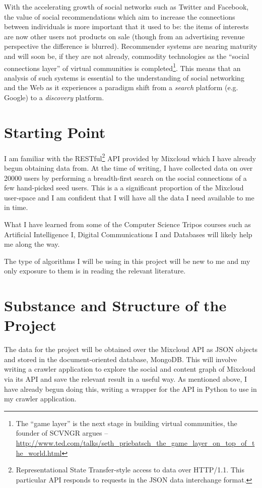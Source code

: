 With the accelerating growth of social networks such as Twitter and Facebook, the value of social recommendations which aim to increase the connections between individuals is more important that it used to be: the items of interests are now other users not products on sale (though from an advertising revenue perspective the difference is blurred). Recommender systems are nearing maturity and will soon be, if they are not already, commodity technologies as the ``social connections layer'' of virtual communities is completed\footnote{The ``game layer'' is the next stage in building virtual communities, the founder of SCVNGR argues -- \url{http://www.ted.com/talks/seth_priebatsch_the_game_layer_on_top_of_the_world.html}}. This means that an analysis of such systems is essential to the understanding of social networking and the Web as it experiences a paradigm shift from a \emph{search} platform (e.g. Google) to a \emph{discovery} platform.

\section{Starting Point}

I am familiar with the RESTful\footnote{Representational State Transfer-style access to data over HTTP/1.1. This particular API responds to requests in the JSON data interchange format.} API provided by Mixcloud which I have already begun obtaining data from. At the time of writing, I have collected data on over 20000 users by performing a breadth-first search on the social connections of a few hand-picked seed users. This is a a significant proportion of the Mixcloud user-space and I am confident that I will have all the data I need available to me in time.

What I have learned from some of the Computer Science Tripos courses such as Artificial Intelligence I, Digital Communications I and Databases will likely help me along the way.

The type of algorithms I will be using in this project will be new to me and my only exposure to them is in reading the relevant literature.
  
\section{Substance and Structure of the Project}

The data for the project will be obtained over the Mixcloud API as JSON objects and stored in the document-oriented database, MongoDB. This will involve writing a crawler application to explore the social and content graph of Mixcloud via its API and save the relevant result in a useful way. As mentioned above, I have already begun doing this, writing a wrapper for the API in Python to use in my crawler application.


